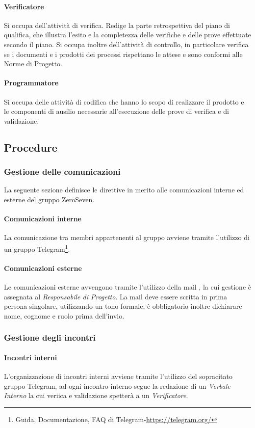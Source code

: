 \paragraph{Verificatore} Si occupa dell'attività di verifica. Redige la parte retrospettiva del piano di qualifica, che illustra l'esito e la completezza delle verifiche e delle prove effettuate secondo il piano. Si occupa  inoltre dell'attività di controllo, in particolare verifica se i documenti e i prodotti dei processi rispettano le attese e sono conformi alle Norme di Progetto.
\paragraph{Programmatore} Si occupa delle attività di codifica che hanno lo scopo di realizzare il prodotto e le componenti di ausilio necessarie all'esecuzione delle prove di verifica e di validazione. 
\subsection{Procedure}
\subsubsection{Gestione delle comunicazioni}
La seguente sezione definisce le direttive in merito alle comunicazioni interne ed esterne del gruppo ZeroSeven.
\paragraph{Comunicazioni interne}
La comunicazione tra membri appartenenti al gruppo avviene tramite l'utilizzo di un gruppo Telegram\footnote{Guida, Documentazione, FAQ di Telegram-\url{https://telegram.org/}}.
\paragraph{Comunicazioni esterne}
Le comunicazioni esterne avvengono tramite l'utilizzo della mail \mailzeroseven, la cui gestione è assegnata al \textit{Responsabile di Progetto}.
La mail deve essere scritta in prima persona singolare, utilizzando un tono formale, è obbligatorio inoltre dichiarare nome, cognome e ruolo prima dell'invio.
\subsubsection{Gestione degli incontri}
\paragraph{Incontri interni} L'organizzazione di incontri interni avviene tramite l'utilizzo del sopracitato gruppo Telegram, ad ogni incontro interno segue la redazione di un \textit{Verbale Interno} la cui veriica e validazione spetterà a un \textit{Verificatore}.
